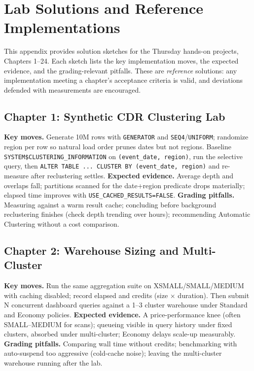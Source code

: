 \chapter{Lab Solutions and Reference Implementations}
%
This appendix provides solution sketches for the Thursday hands-on projects, Chapters 1--24. Each sketch lists the key implementation moves, the expected evidence, and the grading-relevant pitfalls. These are \emph{reference} solutions: any implementation meeting a chapter's acceptance criteria is valid, and deviations defended with measurements are encouraged.

\section{Chapter 1: Synthetic CDR Clustering Lab}
\textbf{Key moves.} Generate 10M rows with \texttt{GENERATOR} and \texttt{SEQ4}/\texttt{UNIFORM}; randomize region per row so natural load order prunes dates but not regions. Baseline \texttt{SYSTEM\$CLUSTERING\_INFORMATION} on \texttt{(event\_date, region)}, run the selective query, then \texttt{ALTER TABLE ... CLUSTER BY (event\_date, region)} and re-measure after reclustering settles.
\textbf{Expected evidence.} Average depth and overlaps fall; partitions scanned for the date+region predicate drops materially; elapsed time improves with \texttt{USE\_CACHED\_RESULTS=FALSE}.
\textbf{Grading pitfalls.} Measuring against a warm result cache; concluding before background reclustering finishes (check depth trending over hours); recommending Automatic Clustering without a cost comparison.

\section{Chapter 2: Warehouse Sizing and Multi-Cluster}
\textbf{Key moves.} Run the same aggregation suite on XSMALL/SMALL/MEDIUM with caching disabled; record elapsed and credits (size $\times$ duration). Then submit N concurrent dashboard queries against a 1--3 cluster warehouse under Standard and Economy policies.
\textbf{Expected evidence.} A price-performance knee (often SMALL--MEDIUM for scans); queueing visible in query history under fixed clusters, absorbed under multi-cluster; Economy delays scale-up measurably.
\textbf{Grading pitfalls.} Comparing wall time without credits; benchmarking with auto-suspend too aggressive (cold-cache noise); leaving the multi-cluster warehouse running after the lab.

